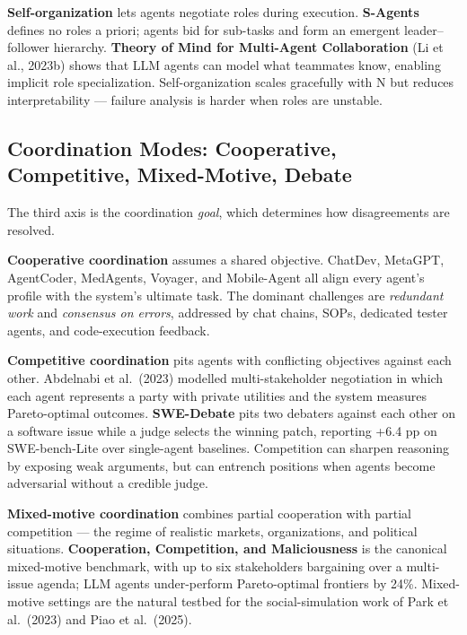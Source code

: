 \documentclass{article}
\begin{document}
\textbf{Self-organization} lets agents negotiate roles during execution. \textbf{S-Agents} \citep{chen2024asurveyonllmbasedm} defines no roles a priori; agents bid for sub-tasks and form an emergent leader--follower hierarchy. \textbf{Theory of Mind for Multi-Agent Collaboration} (Li et al., 2023b) shows that LLM agents can model what teammates know, enabling implicit role specialization. Self-organization scales gracefully with N but reduces interpretability --- failure analysis is harder when roles are unstable.

\subsection{Coordination Modes: Cooperative, Competitive, Mixed-Motive, Debate}\label{coordination-modes-cooperative-competitive-mixed-motive-debate}

The third axis is the coordination \emph{goal}, which determines how disagreements are resolved.

\textbf{Cooperative coordination} assumes a shared objective. ChatDev, MetaGPT, AgentCoder, MedAgents, Voyager, and Mobile-Agent all align every agent's profile with the system's ultimate task. The dominant challenges are \emph{redundant work} and \emph{consensus on errors}, addressed by chat chains, SOPs, dedicated tester agents, and code-execution feedback.

\textbf{Competitive coordination} pits agents with conflicting objectives against each other. Abdelnabi et al.~(2023) modelled multi-stakeholder negotiation in which each agent represents a party with private utilities and the system measures Pareto-optimal outcomes. \textbf{SWE-Debate} \citep{li20252025} pits two debaters against each other on a software issue while a judge selects the winning patch, reporting +6.4 pp on SWE-bench-Lite over single-agent baselines. Competition can sharpen reasoning by exposing weak arguments, but can entrench positions when agents become adversarial without a credible judge.

\textbf{Mixed-motive coordination} combines partial cooperation with partial competition --- the regime of realistic markets, organizations, and political situations. \textbf{Cooperation, Competition, and Maliciousness} \citep{abdelnabi2023cooperationcompeti} is the canonical mixed-motive benchmark, with up to six stakeholders bargaining over a multi-issue agenda; LLM agents under-perform Pareto-optimal frontiers by 24\%. Mixed-motive settings are the natural testbed for the social-simulation work of Park et al.~(2023) and Piao et al.~(2025).
\end{document}
